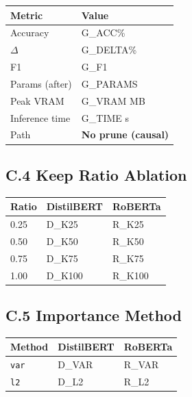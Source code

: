 \begin{table}[H]
\centering
\small
\begin{tabular}{ll}
\toprule
\textbf{Metric} & \textbf{Value} \\
\midrule
Accuracy & {{G\_ACC}}\% \\
$\Delta$ & {{G\_DELTA}}\% \\
F1 & {{G\_F1}} \\
Params (after) & {{G\_PARAMS}} \\
Peak VRAM & {{G\_VRAM}} MB \\
Inference time & {{G\_TIME}} s \\
Path & \textbf{No prune (causal)} \\
\bottomrule
\end{tabular}
\end{table}

\subsection{C.4 Keep Ratio Ablation}

\begin{table}[H]
\centering
\small
\begin{tabular}{lll}
\toprule
\textbf{Ratio} & \textbf{DistilBERT} & \textbf{RoBERTa} \\
\midrule
0.25 & {{D\_K25}} & {{R\_K25}} \\
0.50 & {{D\_K50}} & {{R\_K50}} \\
0.75 & {{D\_K75}} & {{R\_K75}} \\
1.00 & {{D\_K100}} & {{R\_K100}} \\
\bottomrule
\end{tabular}
\end{table}

\subsection{C.5 Importance Method}

\begin{table}[H]
\centering
\small
\begin{tabular}{lll}
\toprule
\textbf{Method} & \textbf{DistilBERT} & \textbf{RoBERTa} \\
\midrule
\texttt{var} & {{D\_VAR}} & {{R\_VAR}} \\
\texttt{l2} & {{D\_L2}} & {{R\_L2}} \\
\bottomrule
\end{tabular}
\end{table}

